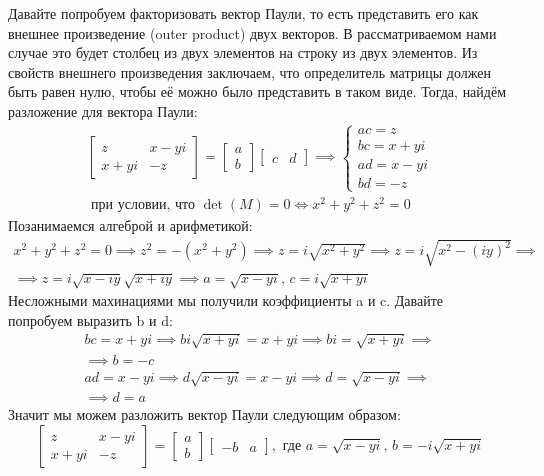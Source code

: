 Давайте попробуем факторизовать вектор Паули, то есть представить его как внешнее произведение (outer product) двух векторов. В рассматриваемом нами случае это будет столбец из двух элементов на строку из двух элементов. Из свойств внешнего произведения заключаем, что определитель матрицы должен быть равен нулю, чтобы её можно было представить в таком виде. Тогда, найдём разложение для вектора Паули:
\begin{gather*}
\begin{bmatrix} z & x-yi\\ x + yi & -z \end{bmatrix} = \begin{bmatrix} a \\ b \end{bmatrix}\begin{bmatrix} c & d \end{bmatrix} \implies \begin{cases} ac = z \\ bc = x + yi \\ ad = x - yi \\ bd = -z \end{cases} \\ 
\text{ при условии, что } \det(M) = 0 \Longleftrightarrow x^2 + y^2 + z^2 = 0
\end{gather*}
Позанимаемся алгеброй и арифметикой:
\begin{gather*}
    x^2 + y^2 + z^2 = 0 \implies z^2 = -(x^2 + y^2) \implies z = i\sqrt{x^2 + y^2} \implies z = i\sqrt{x^2 - (iy)^2} \implies \\ \implies z = i\sqrt{x-iy}\sqrt{x+iy} \implies a = \sqrt{x-yi},\, c = i\sqrt{x+yi}
\end{gather*}
Несложными махинациями мы получили коэффициенты a и c. Давайте попробуем выразить b и d:
\begin{gather*}
    bc = x + yi \implies b i\sqrt{x+yi} = x + yi \implies bi = \sqrt{x+yi} \implies \\ \implies b = -c \\
    ad = x - yi \implies d\sqrt{x-yi} = x - yi \implies d = \sqrt{x - yi} \implies \\ \implies d = a
\end{gather*}
Значит мы можем разложить вектор Паули следующим образом:
\[
\begin{bmatrix} z & x-yi\\ x + yi & -z \end{bmatrix} = \begin{bmatrix} a \\ b \end{bmatrix}\begin{bmatrix} -b & a \end{bmatrix}, \text{ где } a = \sqrt{x-yi},\, b = -i\sqrt{x+yi}
\]
